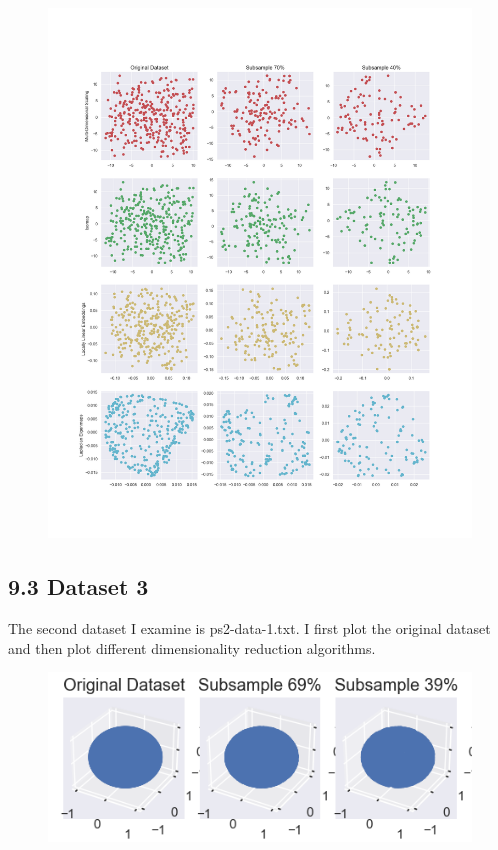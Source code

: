\documentclass{article}
\begin{document}
            \begin{figure}[h]
                \label{fig:ps2_clustering}
                \includegraphics[width=1.2\linewidth]{images/ps1-dataset2.png}
            \end{figure}
            \clearpage

        \subsection*{9.3 Dataset 3}
            The second dataset I examine is ps2-data-1.txt. I first plot the original dataset and then plot different dimensionality reduction algorithms.

            \begin{figure}[h]
                \label{fig:ps3_clustering_original}
                \includegraphics[]{images/ps2-dataset1-original.png}
            \end{figure}
\end{document}
